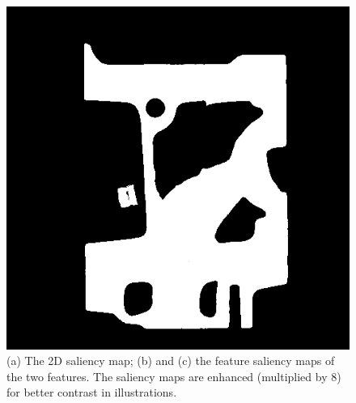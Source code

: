 \begin{figure}
\begin{minipage}{.33\textwidth}
	\end{minipage}~
	\begin{minipage}{.33\textwidth}
		\includegraphics[width=1\linewidth]{images/engine_naive_saliencemap_2_overlap}
	\end{minipage}
	\caption[The 2D saliency map and feature saliency maps]{(a) The 2D saliency map; (b) and (c) the feature saliency maps of the two features. The saliency maps are enhanced (multiplied by 8) for better contrast in illustrations.}
	\label{fig:engine_naive_saliencemap}
\end{figure}

